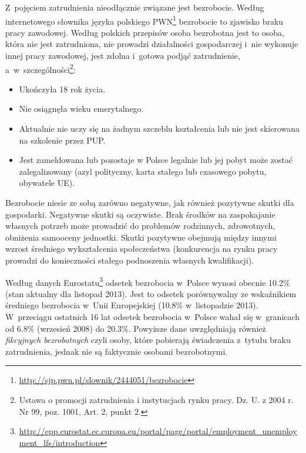 \documentclass[12pt]{article}
\begin{document}
    Z~pojęciem zatrudnienia nieodłącznie związane jest bezrobocie. Według internetowego słownika języka polskiego PWN\footnote{\url{http://sjp.pwn.pl/slownik/2444051/bezrobocie}} bezrobocie to zjawisko braku pracy zawodowej. Według polskich przepisów osoba bezrobotna jest to osoba, która nie jest zatrudniona, nie prowadzi działalności gospodarczej i~nie wykonuje innej pracy zawodowej, jest zdolna i~gotowa podjąć zatrudnienie, a~w~szczególności\footnote{Ustawa o promocji zatrudnienia i instytucjach rynku pracy. Dz. U. z 2004 r. Nr 99, poz. 1001, Art. 2, punkt 2.}:
    
    \begin{itemize}
        \item Ukończyła 18 rok życia.
        \item Nie osiągnęła wieku emerytalnego.
        \item Aktualnie nie uczy się na żadnym szczeblu kształcenia lub nie jest skierowana na szkolenie przez PUP.
        \item Jest zameldowana lub pozostaje w Polsce legalnie lub jej pobyt może zostać zalegalizowany (azyl polityczny, karta stałego lub czasowego pobytu, obywatele UE).
    \end{itemize}
    
    Bezrobocie niesie ze sobą zarówno negatywne, jak również pozytywne skutki dla gospodarki. Negatywne skutki są oczywiste. Brak środków na zaspokajanie własnych potrzeb może prowadzić do problemów rodzinnych, zdrowotnych, obniżenia samooceny jednostki. Skutki pozytywne obejmują między innymi wzrost średniego wykształcenia społeczeństwa (konkurencja na rynku pracy prowadzi do konieczności stałego podnoszenia własnych kwalifikacji).
    
    Według danych Eurostatu\footnote{\url{http://epp.eurostat.ec.europa.eu/portal/page/portal/employment_unemployment_lfs/introduction}} odsetek bezrobocia w~Polsce wynosi obecnie 10.2\% (stan aktualny dla listopad 2013). Jest to odsetek porównywalny ze wskaźnikiem średniego bezrobocia w~Unii Europejskiej (10.8\% w~listopadzie 2013). W~przeciągu ostatnich 16 lat odsetek bezrobocia w~Polsce wahał się w~granicach od 6.8\% (wrzesień 2008) do 20.3\%. Powyższe dane uwzględniają również \emph{fikcyjnych bezrobotnych} czyli osoby, które pobierają świadczenia z~tytułu braku zatrudnienia, jednak nie są faktycznie osobami bezrobotnymi.
    
\end{document}
